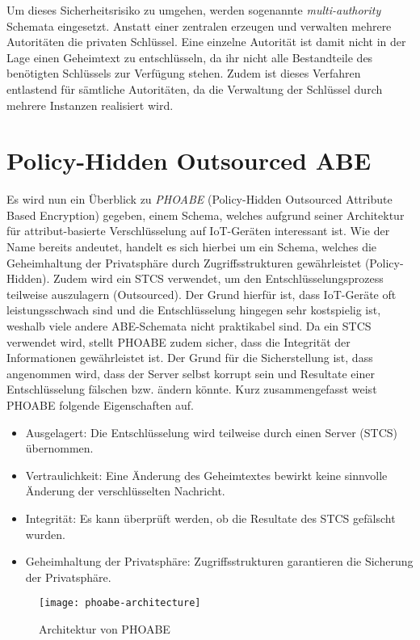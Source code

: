 \documentclass{hsflensburg}
\begin{document}
	Um dieses Sicherheitsrisiko zu umgehen, werden sogenannte
	\textit{multi-authority} Schemata eingesetzt. Anstatt einer zentralen erzeugen
	und verwalten mehrere Autoritäten die privaten Schlüssel. Eine einzelne
	Autorität ist damit nicht in der Lage einen Geheimtext zu entschlüsseln, da
	ihr nicht alle Bestandteile des benötigten Schlüssels zur Verfügung stehen.
	Zudem ist dieses Verfahren entlastend für sämtliche Autoritäten, da die
	Verwaltung der Schlüssel durch mehrere Instanzen realisiert wird.

	\section{Policy-Hidden Outsourced ABE}
	Es wird nun ein Überblick zu \textit{PHOABE} (Policy-Hidden Outsourced
	Attribute Based Encryption) gegeben, einem Schema, welches aufgrund seiner
	Architektur für attribut-basierte Verschlüsselung auf IoT-Geräten interessant
	ist. Wie der Name bereits andeutet, handelt es sich hierbei um ein Schema,
	welches die Geheimhaltung der Privatsphäre durch Zugriffsstrukturen gewährleistet
	(Policy-Hidden). Zudem wird ein STCS verwendet, um den Entschlüsselungsprozess
	teilweise auszulagern (Outsourced). Der Grund hierfür ist, dass IoT-Geräte oft
	leistungsschwach sind und die Entschlüsselung hingegen sehr kostspielig ist,
	weshalb viele andere ABE-Schemata nicht praktikabel sind. Da ein STCS
	verwendet wird, stellt PHOABE zudem sicher, dass die Integrität der
	Informationen gewährleistet ist. Der Grund für die Sicherstellung ist, dass
	angenommen wird, dass der Server selbst korrupt sein und Resultate einer
	Entschlüsselung fälschen bzw. ändern könnte. Kurz zusammengefasst weist PHOABE
	folgende Eigenschaften auf.

	\begin{itemize}
		\item Ausgelagert: Die Entschlüsselung wird teilweise durch einen Server
			(STCS) übernommen.
		\item Vertraulichkeit: Eine Änderung des Geheimtextes bewirkt keine
			sinnvolle Änderung der verschlüsselten Nachricht.
		\item Integrität: Es kann überprüft werden, ob die Resultate des STCS
			ge\-fälscht wurden.
		\item Geheimhaltung der Privatsphäre: Zugriffsstrukturen garantieren die
			Sicherung der Privatsphäre.
	\end{itemize}

	\begin{figure}
		\centering
		\texttt{[image: phoabe-architecture]}
		\caption{Architektur von PHOABE \cite{phoabe}}
	\end{figure}

	\newpage
	
	
\end{document}
